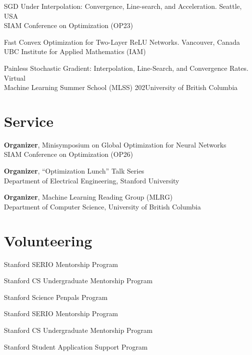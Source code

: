 \documentclass[11pt, a4paper]{article}
\newcommand{\mleftsize}{4.75em}
\begin{document}
\begin{description}[leftmargin=\mleftsize,style=nextline,font=\normalfont\space]
    \item[2023] SGD Under Interpolation: Convergence, Line-search, and Acceleration. \hfill Seattle, USA\\
          SIAM Conference on Optimization (OP23)

    \item[2022] Fast Convex Optimization for Two-Layer ReLU Networks. \hfill Vancouver, Canada\\
          UBC Institute for Applied Mathematics (IAM)

    \item[2020] Painless Stochastic Gradient: Interpolation, Line-Search, and Convergence Rates. \hfill Virtual\\
          Machine Learning Summer School (MLSS) 202University of British Columbia\end{description}

\section{Service}

\begin{description}[leftmargin=\mleftsize,style=nextline,font=\normalfont\space]
    \item[2026] \textbf{Organizer}, Minisymposium on Global Optimization for Neural Networks \\
          SIAM Conference on Optimization (OP26)
    \item[2024] \textbf{Organizer}, ``Optimization Lunch'' Talk Series\\
          Department of Electrical Engineering, Stanford University
    \item[2019] \textbf{Organizer}, Machine Learning Reading Group (MLRG)\\
          Department of Computer Science, University of British Columbia
\end{description}

\section{Volunteering}

\begin{description}[leftmargin=\mleftsize,style=nextline,font=\normalfont\space]
    \item[2025] Stanford SERIO Mentorship Program
    \item[2025] Stanford CS Undergraduate Mentorship Program
    \item[2025] Stanford Science Penpals Program
    \item[2024] Stanford SERIO Mentorship Program
    \item[2024] Stanford CS Undergraduate Mentorship Program
    \item[2024] Stanford Student Application Support Program
\end{description}
\end{document}
